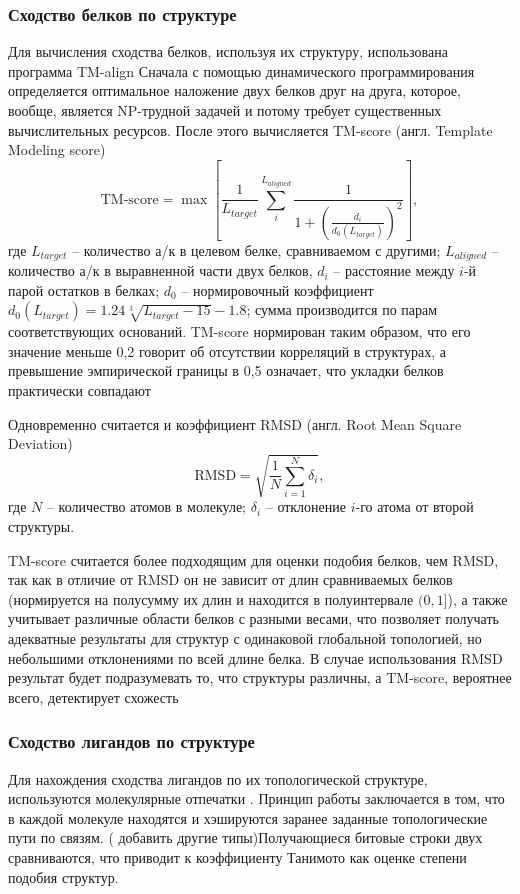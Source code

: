 \documentclass[a4paper,14pt]{article}         %
\begin{document}
\subsubsection{Сходство белков по структуре}
Для вычисления сходства белков, используя их структуру, использована программа TM-align \cite{TM} %
Сначала с помощью динамического программирования определяется оптимальное наложение двух белков друг на друга, которое, вообще, является NP-трудной задачей \cite{Lathrop1994} 
и потому требует существенных вычислительных ресурсов. После этого вычисляется TM-score (англ. Template Modeling score)\cite{Levitt1998} 
\begin{equation}
\label{tm-score}
\text{TM-score} = \max\left[\frac{1}{L_{target}}\sum_i^{L_{aligned}}\frac{1}{1+\left(\frac{d_i}{d_0(L_{target})}\right)^2}\right],
\end{equation}
где $L_{target}$ -- количество а/к в целевом белке, сравниваемом с другими; $L_{aligned}$ -- количество а/к в выравненной части двух белков, $d_i$ -- расстояние между $i$-й парой остатков в белках; $d_0$ -- нормировочный коэффициент $d_0(L_{target}) = 1.24\sqrt[3]{L_{target}-15}-1.8$; сумма производится по парам соответствующих оснований. TM-score нормирован таким образом, что его значение меньше 0,2 говорит об отсутствии корреляций в структурах, а превышение эмпирической границы в 0,5 означает, что укладки белков практически совпадают %

Одновременно считается и коэффициент RMSD (англ. Root Mean Square Deviation) %
\begin{equation}
\label{rmsd}
\text{RMSD} = \sqrt{\frac{1}{N}\sum_{i=1}^N \delta_i},
\end{equation}
где $N$ -- количество атомов в молекуле; $\delta_i$ -- отклонение $i$-го атома от второй структуры.

TM-score считается более подходящим для оценки подобия белков, чем RMSD, так как в отличие от RMSD он не зависит от длин сравниваемых белков (нормируется на полусумму их длин и находится в полуинтервале $(0, 1]$), а также учитывает различные области белков с разными весами, что позволяет получать адекватные результаты для структур с одинаковой глобальной топологией, но небольшими отклонениями по всей длине белка. В случае использования RMSD результат будет подразумевать то, что структуры различны, а TM-score, вероятнее всего, детектирует схожесть %
\subsubsection{Сходство лигандов по структуре}
Для нахождения сходства лигандов по их топологической структуре, используются молекулярные отпечатки \cite{Cereto-Massague2015}. Принцип работы заключается в том, что в каждой молекуле находятся и хэшируются заранее заданные топологические пути по связям. (\color{orange} добавить другие типы\color{black})Получающиеся битовые строки двух сравниваются, что приводит к коэффициенту Танимото как оценке степени подобия структур.
\end{document}

